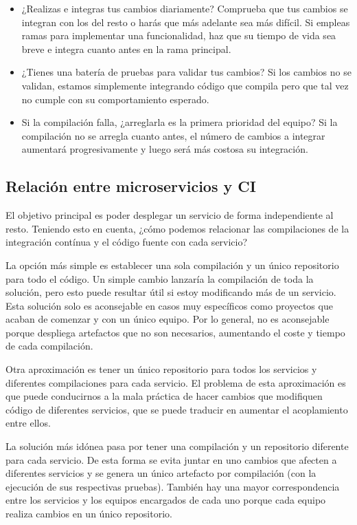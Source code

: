 \documentclass[11pt,a4paper]{article}
\begin{document}
\begin{itemize}

\item ¿Realizas e integras tus cambios diariamente? Comprueba que tus cambios se integran con los del resto o harás que más adelante sea más difícil. Si empleas ramas para implementar una funcionalidad, haz que su tiempo de vida sea breve e integra cuanto antes en la rama principal.

\item ¿Tienes una batería de pruebas para validar tus cambios? Si los cambios no se validan, estamos simplemente integrando código que compila pero que tal vez no cumple con su comportamiento esperado.

\item Si la compilación falla, ¿arreglarla es la primera prioridad del equipo? Si la compilación no se arregla cuanto antes, el número de cambios a integrar aumentará progresivamente y luego será más costosa su integración.

\end{itemize}

\subsection{Relación entre microservicios y CI}

El objetivo principal es poder desplegar un servicio de forma independiente al resto. Teniendo esto en cuenta, ¿cómo podemos relacionar las compilaciones de la integración contínua y el código fuente con cada servicio?

La opción más simple es establecer una sola compilación y un único repositorio para todo el código. 
Un simple cambio lanzaría la compilación de toda la solución, pero esto puede resultar útil si estoy modificando más de un servicio. Esta solución solo es aconsejable en casos muy específicos como proyectos que acaban de comenzar y con un único equipo. Por lo general, no es aconsejable porque despliega artefactos que no son necesarios, aumentando el coste y tiempo de cada compilación.

Otra aproximación es tener un único repositorio para todos los servicios y diferentes compilaciones para cada servicio. El problema de esta aproximación es que puede conducirnos a la mala práctica de hacer cambios que modifiquen código de diferentes servicios, que se puede traducir en aumentar el acoplamiento entre ellos.

La solución más idónea pasa por tener una compilación y un repositorio diferente para cada servicio. De esta forma se evita juntar en uno cambios que afecten a diferentes servicios y se genera un único artefacto por compilación (con la ejecución de sus respectivas pruebas). También hay una mayor correspondencia entre los servicios y los equipos encargados de cada uno porque cada equipo realiza cambios en un único repositorio.
\end{document}
